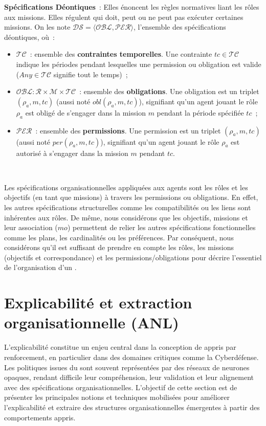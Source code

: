 \noindent \textbf{Spécifications Déontiques}~: Elles énoncent les règles normatives liant les rôles aux missions.
Elles régulent qui doit, peut ou ne peut pas exécuter certaines missions. On les note \quad $\mathcal{DS} = \langle \mathcal{OBL}, \mathcal{PER} \rangle$, l'ensemble des spécifications déontiques, où~:
%
\begin{itemize}
  \item $\mathcal{TC}$~: ensemble des \textbf{contraintes temporelles}. Une contrainte $tc \in \mathcal{TC}$ indique les périodes pendant lesquelles une permission ou obligation est valide ($Any \in \mathcal{TC}$ signifie tout le temps)~;
  \item $\mathcal{OBL}: \mathcal{R} \times \mathcal{M} \times \mathcal{TC}$~: ensemble des \textbf{obligations}. Une obligation est un triplet $(\rho_a, m, tc)$ (aussi noté $obl(\rho_a, m, tc)$), signifiant qu'un agent jouant le rôle $\rho_a$ est obligé de s'engager dans la mission $m$ pendant la période spécifiée $tc$~;
  \item $\mathcal{PER}$~: ensemble des \textbf{permissions}. Une permission est un triplet $(\rho_a, m, tc)$ (aussi noté $per(\rho_a, m, tc)$), signifiant qu'un agent jouant le rôle $\rho_a$ est autorisé à s'engager dans la mission $m$ pendant $tc$.
\end{itemize}

\

\noindent Les spécifications organisationnelles appliquées aux agents sont les rôles et les objectifs (en tant que missions) à travers les permissions ou obligations. En effet, les autres spécifications structurelles comme les compatibilités ou les liens sont inhérentes aux rôles. De même, nous considérons que les objectifs, missions et leur association ($mo$) permettent de relier les autres spécifications fonctionnelles comme les plans, les cardinalités ou les préférences.
Par conséquent, nous considérons qu'il est suffisant de prendre en compte les rôles, les missions (objectifs et correspondance) et les permissions/obligations pour décrire l'essentiel de l'organisation d'un .


\section{Explicabilité et extraction organisationnelle (ANL)}

\noindent
L'explicabilité constitue un enjeu central dans la conception de 
appris par renforcement, en particulier dans des domaines critiques comme la Cyberdéfense.
Les politiques issues du  sont souvent représentées par des réseaux de neurones
opaques, rendant difficile leur compréhension, leur validation et leur alignement
avec des spécifications organisationnelles.
L'objectif de cette section est de présenter les principales notions et techniques
mobilisées pour améliorer l'explicabilité et extraire des structures organisationnelles
émergentes à partir des comportements appris.

